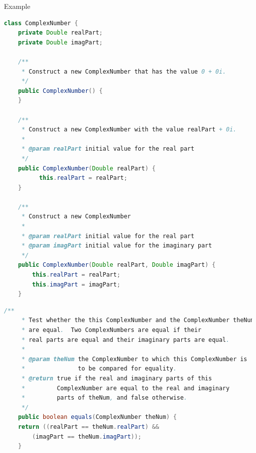 \documentclass[11pt, xcolor=svgnames]{beamer}
\begin{document}

\begin{frame}[fragile]{Example}
\begin{lstlisting}[language=JAVA,basicstyle=\tiny]
class ComplexNumber {
    private Double realPart;
    private Double imagPart;

    /**
     * Construct a new ComplexNumber that has the value 0 + 0i.
     */
    public ComplexNumber() {
    }

    /**
     * Construct a new ComplexNumber with the value realPart + 0i.
     *
     * @param realPart initial value for the real part
     */
    public ComplexNumber(Double realPart) {
	      this.realPart = realPart;
    }

    /**
     * Construct a new ComplexNumber
     *
     * @param realPart initial value for the real part
     * @param imagPart initial value for the imaginary part
     */
    public ComplexNumber(Double realPart, Double imagPart) {
	    this.realPart = realPart;
	    this.imagPart = imagPart;
    }
\end{lstlisting}
\end{frame}



\begin{frame}[fragile]
\begin{lstlisting}[language=JAVA,basicstyle=\tiny]
    /**
     * Test whether the this ComplexNumber and the ComplexNumber theNum
     * are equal.  Two ComplexNumbers are equal if their
     * real parts are equal and their imaginary parts are equal.
     *
     * @param theNum the ComplexNumber to which this ComplexNumber is
     *               to be compared for equality.
     * @return true if the real and imaginary parts of this
     *         ComplexNumber are equal to the real and imaginary
     *         parts of theNum, and false otherwise.
     */
    public boolean equals(ComplexNumber theNum) {
	return ((realPart == theNum.realPart) &&
		(imagPart == theNum.imagPart));
    }
\end{lstlisting}
\end{frame}

\end{document}
